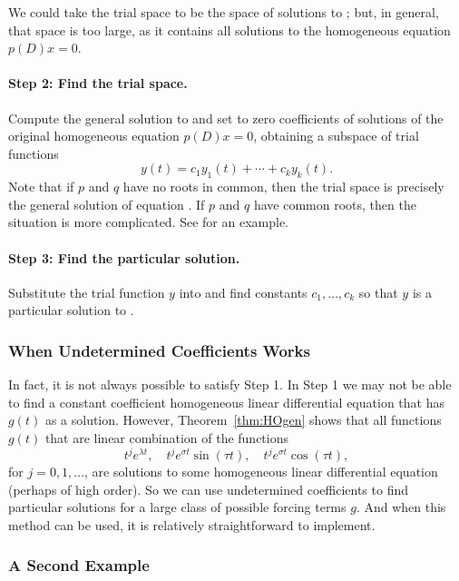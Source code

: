 \documentclass{ximera}
\begin{document}
We could take the trial space to 
be the space of solutions to ;
but, in general, that space is too large, as it contains all solutions to the 
homogeneous equation $p(D)x=0$.

\paragraph{Step 2: Find the trial space.} 
Compute the general solution to  and set to zero 
coefficients of solutions of 
the original homogeneous equation $p(D)x=0$, obtaining a subspace of trial 
functions
\[
y(t)=c_1 y_1(t) + \cdots + c_k y_k(t).
\]
Note that if $p$ and $q$ have no roots in common, then the trial space is 
precisely the general solution of equation .  If $p$ 
and $q$ have common roots, then the situation is more complicated.  See 
 for an example.

\paragraph{Step 3: Find the particular solution.} 
Substitute the trial function $y$ into  and find constants 
$c_1,\ldots,c_k$ so that $y$ is a particular solution to .

\subsubsection*{When Undetermined Coefficients Works}

In fact, it is not always possible to satisfy Step 1.  In Step 1 we may not 
be able to find a constant coefficient homogeneous linear differential 
equation that has $g(t)$ as a solution.  However, Theorem~\ref{thm:HOgen} 
shows that all functions $g(t)$ that are 
linear combination of the functions
\[
t^je^{\lambda t},\quad t^je^{\sigma t}\sin(\tau t),\quad 
t^je^{\sigma t}\cos(\tau t),
\]
for $j=0,1,\ldots$, are solutions to some homogeneous linear differential 
equation (perhaps of high order).  So we can use 
undetermined coefficients to 
find particular solutions for a large class of possible forcing terms $g$.  
And when this method can be used, it is relatively straightforward to implement.


\subsubsection*{A Second Example}
\end{document}
